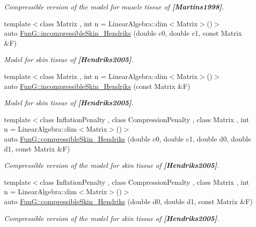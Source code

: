 \begin{DoxyCompactItemize}
\begin{DoxyCompactList}\small\item\em Compressible version of the model for muscle tissue of {\bfseries [Martins1998]}. \end{DoxyCompactList}\item 
{\footnotesize template$<$class Matrix , int n = Linear\+Algebra\+::dim$<$\+Matrix$>$()$>$ }\\auto \hyperlink{group__Biomechanics_gaa20bf15ef6976d64d89490429035b2c4}{Fun\+G\+::incompressible\+Skin\+\_\+\+Hendriks} (double c0, double c1, const Matrix \&F)
\begin{DoxyCompactList}\small\item\em Model for skin tissue of {\bfseries [Hendriks2005]}. \end{DoxyCompactList}\item 
{\footnotesize template$<$class Matrix , int n = Linear\+Algebra\+::dim$<$\+Matrix$>$()$>$ }\\auto \hyperlink{group__Biomechanics_gad8653218bd2afb4e3cfd601a5142956c}{Fun\+G\+::incompressible\+Skin\+\_\+\+Hendriks} (const Matrix \&F)
\begin{DoxyCompactList}\small\item\em Model for skin tissue of {\bfseries [Hendriks2005]}. \end{DoxyCompactList}\item 
{\footnotesize template$<$class Inflation\+Penalty , class Compression\+Penalty , class Matrix , int n = Linear\+Algebra\+::dim$<$\+Matrix$>$()$>$ }\\auto \hyperlink{group__Biomechanics_ga07b4c52c6ecf7e72f73ab5832fb262cd}{Fun\+G\+::compressible\+Skin\+\_\+\+Hendriks} (double c0, double c1, double d0, double d1, const Matrix \&F)
\begin{DoxyCompactList}\small\item\em Compressible version of the model for skin tissue of {\bfseries [Hendriks2005]}. \end{DoxyCompactList}\item 
{\footnotesize template$<$class Inflation\+Penalty , class Compression\+Penalty , class Matrix , int n = Linear\+Algebra\+::dim$<$\+Matrix$>$()$>$ }\\auto \hyperlink{group__Biomechanics_ga42721e772b7eada1b0bca98247ad440f}{Fun\+G\+::compressible\+Skin\+\_\+\+Hendriks} (double d0, double d1, const Matrix \&F)
\begin{DoxyCompactList}\small\item\em Compressible version of the model for skin tissue of {\bfseries [Hendriks2005]}. \end{DoxyCompactList}\end{DoxyCompactItemize}


